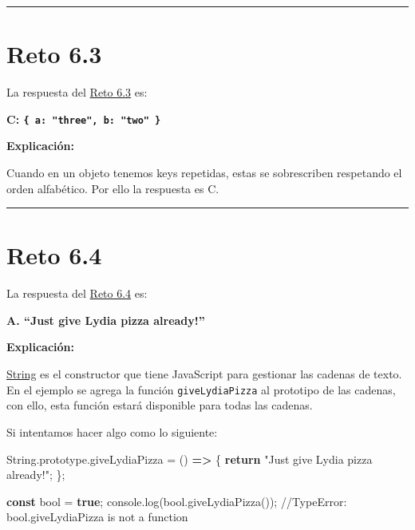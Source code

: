 \documentclass[
  letterpaper,
  DIV=11,
  numbers=noendperiod]{scrreprt}
\newenvironment{Shaded}{\begin{snugshade}}{\end{snugshade}}
\newcommand{\AttributeTok}[1]{\textcolor[rgb]{0.40,0.45,0.13}{#1}}
\newcommand{\BuiltInTok}[1]{\textcolor[rgb]{0.00,0.23,0.31}{#1}}
\newcommand{\CommentTok}[1]{\textcolor[rgb]{0.37,0.37,0.37}{#1}}
\newcommand{\ControlFlowTok}[1]{\textcolor[rgb]{0.00,0.23,0.31}{\textbf{#1}}}
\newcommand{\FunctionTok}[1]{\textcolor[rgb]{0.28,0.35,0.67}{#1}}
\newcommand{\KeywordTok}[1]{\textcolor[rgb]{0.00,0.23,0.31}{\textbf{#1}}}
\newcommand{\NormalTok}[1]{\textcolor[rgb]{0.00,0.23,0.31}{#1}}
\newcommand{\OperatorTok}[1]{\textcolor[rgb]{0.37,0.37,0.37}{#1}}
\newcommand{\StringTok}[1]{\textcolor[rgb]{0.13,0.47,0.30}{#1}}
\begin{document}
\begin{center}\rule{0.5\linewidth}{0.5pt}\end{center}

\section{Reto 6.3}\label{sec-sol-cap6-reto3}

La respuesta del \hyperref[sec-cap6-reto3]{Reto 6.3} es:

\textbf{C: \texttt{\{\ a:\ "three",\ b:\ "two"\ \}}}

\textbf{Explicación:}

Cuando en un objeto tenemos keys repetidas, estas se sobrescriben
respetando el orden alfabético. Por ello la respuesta es C.

\begin{center}\rule{0.5\linewidth}{0.5pt}\end{center}

\section{Reto 6.4}\label{sec-sol-cap6-reto4}

La respuesta del \hyperref[sec-cap6-reto4]{Reto 6.4} es:

\textbf{A. ``Just give Lydia pizza already!''}

\textbf{Explicación:}

\hyperref[glos-String]{String} es el constructor que tiene JavaScript
para gestionar las cadenas de texto. En el ejemplo se agrega la función
\texttt{giveLydiaPizza} al prototipo de las cadenas, con ello, esta
función estará disponible para todas las cadenas.

Si intentamos hacer algo como lo siguiente:

\begin{Shaded}
\begin{Highlighting}[]
\BuiltInTok{String}\OperatorTok{.}\AttributeTok{prototype}\OperatorTok{.}\AttributeTok{giveLydiaPizza} \OperatorTok{=}\NormalTok{ () }\KeywordTok{=\textgreater{}}\NormalTok{ \{}
  \ControlFlowTok{return} \StringTok{"Just give Lydia pizza already!"}\OperatorTok{;}
\NormalTok{\}}\OperatorTok{;}

\KeywordTok{const}\NormalTok{ bool }\OperatorTok{=} \KeywordTok{true}\OperatorTok{;}
\BuiltInTok{console}\OperatorTok{.}\FunctionTok{log}\NormalTok{(bool}\OperatorTok{.}\FunctionTok{giveLydiaPizza}\NormalTok{())}\OperatorTok{;} 
\CommentTok{//TypeError: bool.giveLydiaPizza is not a function }
\end{Highlighting}
\end{Shaded}
\end{document}
